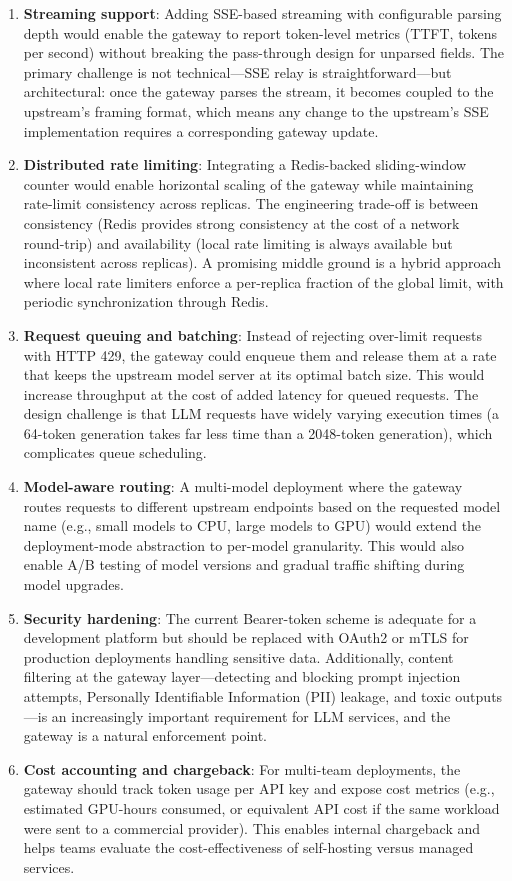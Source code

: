 \documentclass[10pt,journal]{IEEEtran}
\begin{document}
\begin{enumerate}
  \item \textbf{Streaming support}: Adding SSE-based streaming with configurable parsing depth would enable the gateway to report token-level metrics (TTFT, tokens per second) without breaking the pass-through design for unparsed fields. The primary challenge is not technical---SSE relay is straightforward---but architectural: once the gateway parses the stream, it becomes coupled to the upstream's framing format, which means any change to the upstream's SSE implementation requires a corresponding gateway update.
  \item \textbf{Distributed rate limiting}: Integrating a Redis-backed sliding-window counter would enable horizontal scaling of the gateway while maintaining rate-limit consistency across replicas. The engineering trade-off is between consistency (Redis provides strong consistency at the cost of a network round-trip) and availability (local rate limiting is always available but inconsistent across replicas). A promising middle ground is a hybrid approach where local rate limiters enforce a per-replica fraction of the global limit, with periodic synchronization through Redis.
  \item \textbf{Request queuing and batching}: Instead of rejecting over-limit requests with HTTP 429, the gateway could enqueue them and release them at a rate that keeps the upstream model server at its optimal batch size. This would increase throughput at the cost of added latency for queued requests. The design challenge is that LLM requests have widely varying execution times (a 64-token generation takes far less time than a 2048-token generation), which complicates queue scheduling.
  \item \textbf{Model-aware routing}: A multi-model deployment where the gateway routes requests to different upstream endpoints based on the requested model name (e.g., small models to CPU, large models to GPU) would extend the deployment-mode abstraction to per-model granularity. This would also enable A/B testing of model versions and gradual traffic shifting during model upgrades.
  \item \textbf{Security hardening}: The current Bearer-token scheme is adequate for a development platform but should be replaced with OAuth2 or mTLS for production deployments handling sensitive data. Additionally, content filtering at the gateway layer---detecting and blocking prompt injection attempts, Personally Identifiable Information (PII) leakage, and toxic outputs---is an increasingly important requirement for LLM services, and the gateway is a natural enforcement point.
  \item \textbf{Cost accounting and chargeback}: For multi-team deployments, the gateway should track token usage per API key and expose cost metrics (e.g., estimated GPU-hours consumed, or equivalent API cost if the same workload were sent to a commercial provider). This enables internal chargeback and helps teams evaluate the cost-effectiveness of self-hosting versus managed services.
\end{enumerate}
\end{document}
